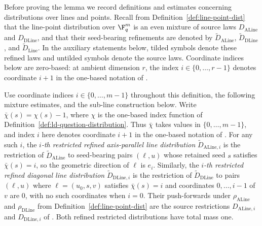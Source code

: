 Before proving the lemma we record definitions and estimates concerning
distributions over lines and points. Recall from
Definition~\ref{def:line-point-dist} that the line-point distribution over
$\F_q^m$ is an even mixture of source laws $D_{\mathrm{ALine}}$ and
$D_{\mathrm{DLine}}$, and that their seed-bearing refinements are denoted by
$\widetilde D_{\mathrm{ALine}}$, $\widetilde D_{\mathrm{DLine}}$, and
$\widetilde D_{\mathrm{Line}}$. In the auxiliary statements below, tilded
symbols denote these refined laws and untilded symbols denote the source laws.
Coordinate indices below are zero-based: at ambient dimension $r$, the index
$i\in\{0,\dots,r-1\}$ denotes coordinate $i+1$ in the one-based notation of
\cite{Ji2020MIPStar}.

\begin{definition}
	\label{def:ith-restricted-line}
	\leanok
	Use coordinate indices $i\in\{0,\dots,m-1\}$ throughout this definition,
	the following mixture estimates, and the sub-line construction below. Write
	$\bar\chi(s)=\chi(s)-1$, where $\chi$ is the one-based index function of
	Definition~\ref{def:ld-question-distribution}. Thus $\bar\chi$ takes
	values in $\{0,\dots,m-1\}$, and index $i$ here denotes coordinate $i+1$
	in the one-based notation of \cite{Ji2020MIPStar}.
	For any such $i$, the \emph{$i$-th restricted refined
	axis-parallel line distribution} $\widetilde D_{\mathrm{ALine},i}$ is the
	restriction of $\widetilde D_{\mathrm{ALine}}$ to seed-bearing pairs
	$(\ell,u)$ whose retained seed $s$ satisfies $\bar\chi(s)=i$, so the geometric
	direction of $\ell$ is $e_i$. Similarly, the \emph{$i$-th restricted
	refined diagonal line distribution} $\widetilde D_{\mathrm{DLine},i}$ is
	the restriction of $\widetilde D_{\mathrm{DLine}}$ to pairs $(\ell,u)$
	where $\ell=(u_0,s,v)$ satisfies $\bar\chi(s)=i$ and coordinates
	$0, \dots, i-1$ of $v$ are $0$, with no such coordinates when $i=0$.
	Their push-forwards under $\rho_{\mathrm{ALine}}$ and
	$\rho_{\mathrm{DLine}}$ from
	Definition~\ref{def:line-point-dist} are the source restrictions
	$D_{\mathrm{ALine},i}$ and $D_{\mathrm{DLine},i}$ of
	\cite{Ji2020MIPStar}. Both refined restricted distributions have total
	mass one.
\end{definition}

